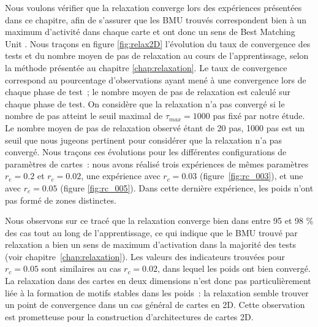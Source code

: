 \documentclass[../main]{subfiles}
\begin{document}
Nous voulons vérifier que la relaxation converge lors des expériences présentées dans ce chapitre, afin de s'assurer que les BMU trouvés correspondent bien à un maximum d'activité dans chaque carte et ont donc un sens de \og Best Matching Unit \fg{}.
Nous traçons en figure \ref{fig:relax2D} l'évolution du taux de convergence des tests et du nombre moyen de pas de relaxation au cours de l'apprentissage, selon la méthode présentée au chapitre \ref{chap:relaxation}. Le taux de convergence correspond au pourcentage d'observations ayant mené à une convergence lors de chaque phase de test~; le nombre moyen de pas de relaxation est calculé sur chaque phase de test.
On considère que la relaxation n'a pas convergé si le nombre de pas atteint le seuil maximal de $\tau_{max} = 1000$ pas fixé par notre étude. Le nombre moyen de pas de relaxation observé étant de 20 pas, 1000 pas est un seuil que nous jugeons pertinent pour considérer que la relaxation n'a pas convergé.
Nous traçons ces évolutions pour les différentes configurations de paramètres de cartes~: nous avons réalisé trois expériences de mêmes paramètres $r_e=0.2$ et $r_c = 0.02$, une expérience avec $r_c = 0.03$ (figure~\ref{fig:rc_003}), et une avec $r_c = 0.05$ (figure \ref{fig:rc_005}).
Dans cette dernière expérience, les poids n'ont pas formé de zones distinctes.


Nous observons sur ce tracé que la relaxation converge bien dans entre 95 et 98 \% des cas tout au long de l'apprentissage, ce qui indique que le BMU trouvé par relaxation a bien un sens de maximum d'activation dans la majorité des tests (voir chapitre~\ref{chap:relaxation}).
Les valeurs des indicateurs trouvées pour $r_c = 0.05$ sont similaires au cas $r_c = 0.02$, dans lequel les poids ont bien convergé. La relaxation dans des cartes en deux dimensions n'est donc pas particulièrement liée à la formation de motifs stables dans les poids~: la relaxation semble trouver un point de convergence dans un cas général de cartes en 2D. Cette observation est prometteuse pour la construction d'architectures de cartes 2D.
\end{document}
